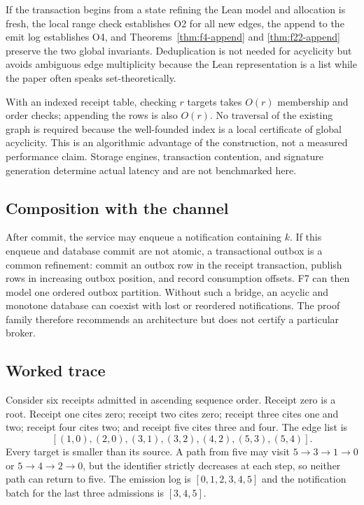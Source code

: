 \documentclass[11pt,letterpaper]{article}
\theoremstyle{definition}
\begin{document}
If the transaction begins from a state refining the Lean model and allocation
is fresh, the local range check establishes O2 for all new edges, the append to
the emit log establishes O4, and Theorems~\ref{thm:f4-append} and
\ref{thm:f22-append} preserve the two global invariants. Deduplication is not
needed for acyclicity but avoids ambiguous edge multiplicity because the Lean
representation is a list while the paper often speaks set-theoretically.

With an indexed receipt table, checking $r$ targets takes $O(r)$ membership and
order checks; appending the rows is also $O(r)$. No traversal of the existing
graph is required because the well-founded index is a local certificate of
global acyclicity. This is an algorithmic advantage of the construction, not a
measured performance claim. Storage engines, transaction contention, and
signature generation determine actual latency and are not benchmarked here.

\subsection{Composition with the channel}

After commit, the service may enqueue a notification containing $k$. If this
enqueue and database commit are not atomic, a transactional outbox is a common
refinement: commit an outbox row in the receipt transaction, publish rows in
increasing outbox position, and record consumption offsets. F7 can then model
one ordered outbox partition. Without such a bridge, an acyclic and monotone
database can coexist with lost or reordered notifications. The proof family
therefore recommends an architecture but does not certify a particular broker.

\subsection{Worked trace}

Consider six receipts admitted in ascending sequence order. Receipt zero is a
root. Receipt one cites zero; receipt two cites zero; receipt three cites one
and two; receipt four cites two; and receipt five cites three and four. The edge
list is
\[
[(1,0),(2,0),(3,1),(3,2),(4,2),(5,3),(5,4)].
\]
Every target is smaller than its source. A path from five may visit
$5\to3\to1\to0$ or $5\to4\to2\to0$, but the identifier strictly decreases at
each step, so neither path can return to five. The emission log is
$[0,1,2,3,4,5]$ and the notification batch for the last three admissions is
$[3,4,5]$.
\end{document}
